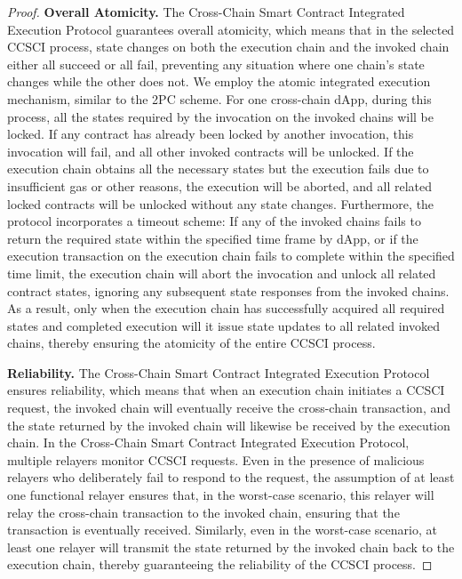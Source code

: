 \begin{proof}
\noindent
\textbf{Overall Atomicity. }
The Cross-Chain Smart Contract Integrated Execution Protocol guarantees overall atomicity, which means that in the selected CCSCI process, state changes on both the execution chain and the invoked chain either all succeed or all fail, preventing any situation where one chain's state changes while the other does not. 
We employ the atomic integrated execution mechanism, similar to the 2PC scheme. 
For one cross-chain dApp, during this process, all the states required by the invocation on the invoked chains will be locked. 
If any contract has already been locked by another invocation, this invocation will fail, and all other invoked contracts will be unlocked. 
If the execution chain obtains all the necessary states but the execution fails due to insufficient gas or other reasons, the execution will be aborted, and all related locked contracts will be unlocked without any state changes. 
Furthermore, the protocol incorporates a timeout scheme: 
If any of the invoked chains fails to return the required state within the specified time frame by dApp, or if the execution transaction on the execution chain fails to complete within the specified time limit, the execution chain will abort the invocation and unlock all related contract states, ignoring any subsequent state responses from the invoked chains. 
As a result, only when the execution chain has successfully acquired all required states and completed execution will it issue state updates to all related invoked chains, thereby ensuring the atomicity of the entire CCSCI process.

\vspace{3pt}
\noindent
\textbf{Reliability. }
The Cross-Chain Smart Contract Integrated Execution Protocol ensures reliability, which means that when an execution chain initiates a CCSCI request, the invoked chain will eventually receive the cross-chain transaction, and the state returned by the invoked chain will likewise be received by the execution chain. 
In the Cross-Chain Smart Contract Integrated Execution Protocol, multiple relayers monitor CCSCI requests. 
Even in the presence of malicious relayers who deliberately fail to respond to the request, the assumption of at least one functional relayer ensures that, in the worst-case scenario, this relayer will relay the cross-chain transaction to the invoked chain, ensuring that the transaction is eventually received. 
Similarly, even in the worst-case scenario, at least one relayer will transmit the state returned by the invoked chain back to the execution chain, thereby guaranteeing the reliability of the CCSCI process.


\end{proof}
